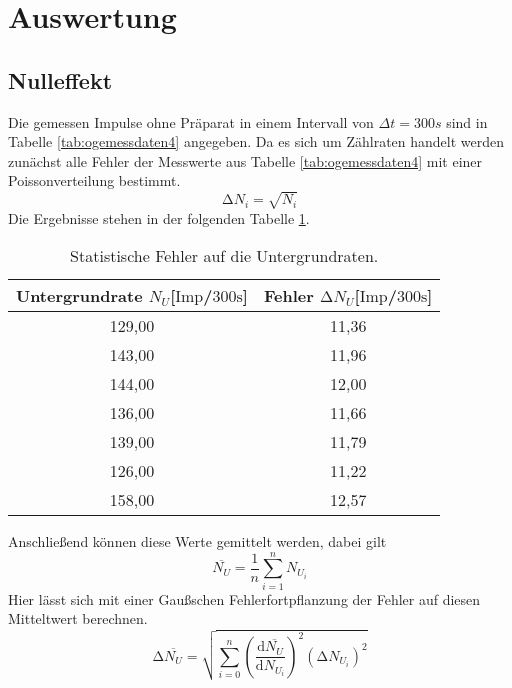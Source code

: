 \section{Auswertung}

\subsection{Nulleffekt}
Die gemessen Impulse ohne Präparat in einem Intervall von $\Delta t = 300\si{s}$ sind in Tabelle \ref{tab:ogemessdaten4} angegeben.
Da es sich um Zählraten handelt werden zunächst alle Fehler der Messwerte aus Tabelle \ref{tab:ogemessdaten4} mit einer Poissonverteilung bestimmt.
\begin{equation}
\label{eqn:poisson}
\increment N_{i} = \sqrt{N_{i}}
\end{equation}
Die Ergebnisse stehen in der folgenden Tabelle \ref{tab:fehleraufn}.
\begin{table}
\centering
\caption{Statistische Fehler auf die Untergrundraten.}
\label{tab:fehleraufn}
\begin{tabular}{c c}
    \toprule
    Untergrundrate $N_{U}$[$\text{Imp}$/$300\si{\second}$] & Fehler $\increment N_{U}$[$\text{Imp}$/$300\si{\second}$]\\
    \midrule
    129{,}00 & 11{,}36\\
    143{,}00 & 11{,}96\\
    144{,}00 & 12{,}00\\
    136{,}00 & 11{,}66\\
    139{,}00 & 11{,}79\\
    126{,}00 & 11{,}22\\ 
    158{,}00 & 12{,}57\\
    \bottomrule
\end{tabular}
\end{table}
Anschließend können diese Werte gemittelt werden, dabei gilt
\begin{equation}
\overline{N_{U}} = \frac{1}{n} \sum_{i=1}^n N_{U_{i}}
\end{equation}
Hier lässt sich mit einer Gaußschen Fehlerfortpflanzung der Fehler auf diesen Mitteltwert berechnen.
\begin{equation}
\increment \overline{N_{U}} = \sqrt{\sum_{i=0}^{n} \left( \frac{\text{d}\overline{N_{U}}}{\text{d}N_{U_{i}}}\right)^{2} (\increment N_{U_{i}})^{2}}
\end{equation}
